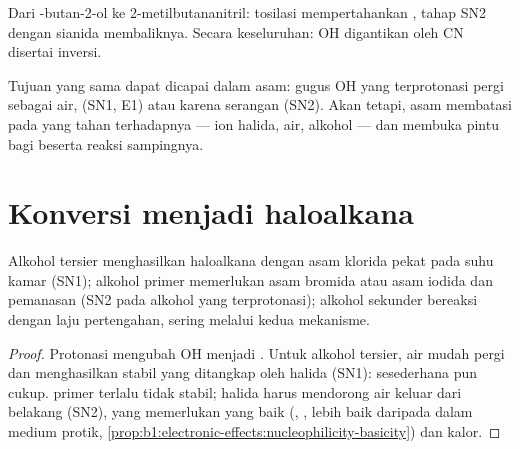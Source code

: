 \begin{omfigure}

{\small Dari -butan-2-ol ke 2-metilbutananitril: tosilasi
mempertahankan , tahap SN2 dengan sianida membaliknya.
Secara keseluruhan: OH digantikan oleh CN disertai inversi.}
\end{omfigure}

Tujuan yang sama dapat dicapai dalam asam: gugus OH yang terprotonasi
pergi sebagai air,  (SN1, E1) atau karena serangan
(SN2). Akan tetapi, asam membatasi  pada yang tahan terhadapnya
--- ion halida, air, alkohol --- dan membuka pintu bagi 
beserta reaksi sampingnya.

\section{Konversi menjadi haloalkana}

\begin{proposition}\label{prop:b1:alcohol-activation:hx-by-class}
Alkohol tersier menghasilkan haloalkana dengan asam klorida pekat pada
suhu kamar (SN1); alkohol primer memerlukan asam bromida atau asam iodida
dan pemanasan (SN2 pada alkohol yang terprotonasi); alkohol sekunder
bereaksi dengan laju pertengahan, sering melalui kedua mekanisme.
\end{proposition}

\begin{proof}
Protonasi mengubah OH menjadi . Untuk alkohol tersier, air
mudah pergi dan menghasilkan  stabil yang ditangkap oleh
halida (SN1):  sesederhana  pun cukup.  primer
terlalu tidak stabil; halida harus mendorong air keluar dari belakang
(SN2), yang memerlukan  yang baik (, , lebih baik
daripada  dalam medium protik,
\cref{prop:b1:electronic-effects:nucleophilicity-basicity}) dan kalor.
\end{proof}

